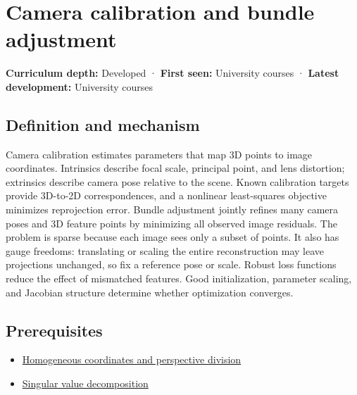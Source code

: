 \hypertarget{appendix-3ee9861904d5}{}\label{referencestart:appendix-3ee9861904d5}
\section{Camera calibration and bundle adjustment}\label{appendix-3ee9861904d5-camera-calibration-and-bundle-adjustment}

\textbf{Curriculum depth:} Developed · \textbf{First seen:} University courses · \textbf{Latest development:} University courses

\begin{allmightroledefinition}

\subsection{Definition and mechanism}\label{appendix-3ee9861904d5-definition-and-mechanism}

Camera calibration estimates parameters that map 3D points to image coordinates. Intrinsics describe focal scale, principal point, and lens distortion; extrinsics describe camera pose relative to the scene. Known calibration targets provide 3D-to-2D correspondences, and a nonlinear least-squares objective minimizes reprojection error. Bundle adjustment jointly refines many camera poses and 3D feature points by minimizing all observed image residuals. The problem is sparse because each image sees only a subset of points. It also has gauge freedoms: translating or scaling the entire reconstruction may leave projections unchanged, so fix a reference pose or scale. Robust loss functions reduce the effect of mismatched features. Good initialization, parameter scaling, and Jacobian structure determine whether optimization converges.

\end{allmightroledefinition}

\subsection{Prerequisites}\label{appendix-3ee9861904d5-prerequisites}

\begin{itemize}
\tightlist
\item
  \hyperref[appendix-cb3b26862282]{Homogeneous coordinates and perspective division}
\item
  \hyperref[appendix-1fad5e7f36fa]{Singular value decomposition}
\end{itemize}

